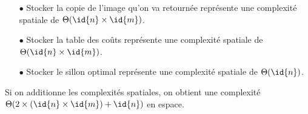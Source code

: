 \documentclass[a4paper, 11pt, oneside]{article}
\begin{document}
\begin{enumerate}
	\item[$\bullet$] Stocker la copie de l'image qu'on va retournée représente une complexité spatiale de $\Theta(\id{n} \times \id{m})$.
	\item[$\bullet$] Stocker la table des coûts représente une complexité spatiale de $\Theta(\id{n} \times \id{m})$.
	\item[$\bullet$] Stocker le sillon optimal représente une complexité spatiale de $\Theta(\id{n})$.
\end{enumerate}

\noindent Si on additionne les complexités spatiales, on obtient une complexité $\Theta(2 \times (\id{n} \times \id{m}) + \id{n})$ en espace.
\end{document}
